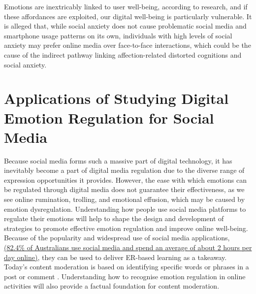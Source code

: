 \documentclass[lettersize,journal]{IEEEtran}
\begin{document}
Emotions are inextricably linked to user well-being, according to research, and if these affordances are exploited, our digital well-being is particularly vulnerable. It is alleged that, while social anxiety does not cause problematic social media and smartphone usage patterns on its own, individuals with high levels of social anxiety may prefer online media over face-to-face interactions, which could be the cause of the indirect pathway linking affection-related distorted cognitions and social anxiety. 





\section{Applications of Studying Digital Emotion Regulation for Social Media}
Because social media forms such a massive part of digital technology, it has inevitably become a part of digital media regulation due to the diverse range of expression opportunities it provides. However, the ease with which emotions can be regulated through digital media does not guarantee their effectiveness, as we see online rumination, trolling, and emotional effusion, which may be caused by emotion dysregulation. Understanding how people use social media platforms to regulate their emotions will help to shape the design and development of strategies to promote effective emotion regulation and improve online well-being. Because of the popularity and widespread use of social media applications,  \href{https://www.genroe.com/blog/social-media-statistics-australia/13492
}{(82.4\% of Australians use social media and spend an average of about 2 hours per day online)}, they can be used to deliver ER-based learning as a takeaway. Today's content moderation is based on identifying specific words or phrases in a post or comment \cite{thomas2022s}. Understanding how to recognise emotion regulation in online activities will also provide a factual foundation for content moderation.
\end{document}
